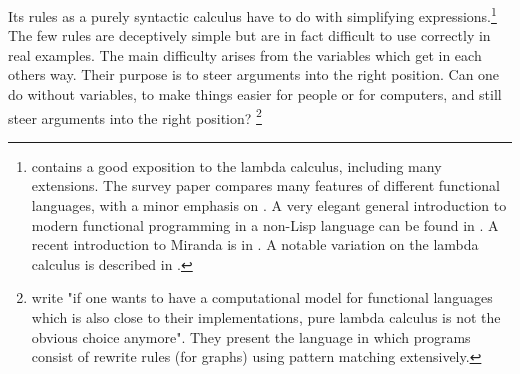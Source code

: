 Its rules as a purely syntactic calculus have to do with simplifying
expressions.\footnote{
contains a good exposition to the lambda calculus,
including many extensions.
The survey paper
compares many features of different functional languages,
with a minor emphasis on .
A very elegant general introduction to modern functional programming
in a non-Lisp language can be found in
.
A recent introduction to Miranda
is in
.
A notable variation on the lambda calculus is described in
.
}
The few rules are deceptively simple but are in fact
difficult to use correctly in real examples.
The main difficulty arises from the variables which
get in each others way.
Their purpose is to steer arguments into the right position.
Can one do without variables,
to make things easier for people or for computers,
and still steer arguments into the right position?
\footnote{
write "if one wants to have a computational model
for functional languages which is also close to their implementations,
pure lambda calculus is not the obvious choice anymore".
They present the language  in which programs
consist of rewrite rules (for graphs)
using pattern matching extensively.
}
